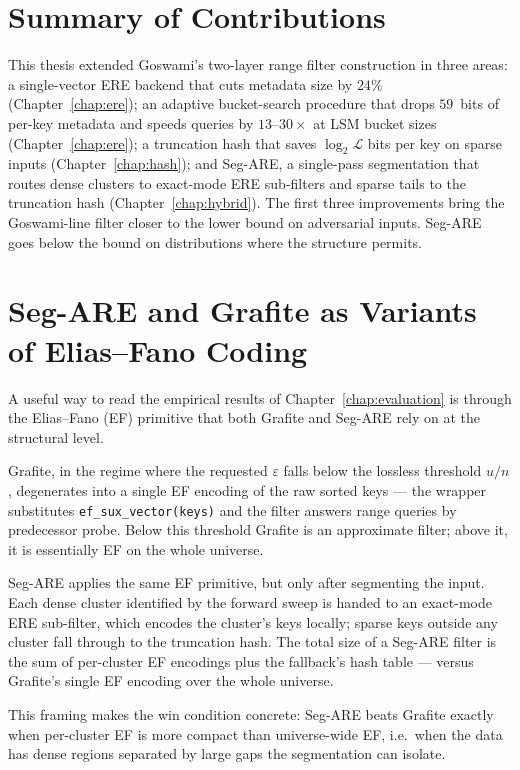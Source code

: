 \section{Summary of Contributions}
\label{sec:conclusion-summary}

This thesis extended Goswami's two-layer range filter construction in
three areas: a single-vector ERE backend that cuts metadata size by
$24\%$ (Chapter~\ref{chap:ere}); an adaptive bucket-search procedure
that drops $59$~bits of per-key metadata and speeds queries by
$13$--$30\times$ at LSM bucket sizes (Chapter~\ref{chap:ere}); a
truncation hash that saves $\log_2 \mathcal{L}$ bits per key on sparse
inputs (Chapter~\ref{chap:hash}); and Seg-ARE, a single-pass
segmentation that routes dense clusters to exact-mode ERE sub-filters
and sparse tails to the truncation hash (Chapter~\ref{chap:hybrid}).
The first three improvements bring the Goswami-line filter closer to
the lower bound on adversarial inputs. Seg-ARE goes below the bound on
distributions where the structure permits.

\section{Seg-ARE and Grafite as Variants of Elias--Fano Coding}
\label{sec:conclusion-ef-view}

A useful way to read the empirical results of
Chapter~\ref{chap:evaluation} is through the Elias--Fano (EF) primitive
that both Grafite and Seg-ARE rely on at the structural level.

Grafite, in the regime where the requested $\varepsilon$ falls below
the lossless threshold $u/n$, degenerates into a single EF encoding of
the raw sorted keys --- the wrapper substitutes
\texttt{ef\_sux\_vector(keys)} and the filter answers range queries by
predecessor probe. Below this threshold Grafite is an approximate
filter; above it, it is essentially EF on the whole universe.

Seg-ARE applies the same EF primitive, but only after segmenting the
input. Each dense cluster identified by the forward sweep is handed to
an exact-mode ERE sub-filter, which encodes the cluster's keys
locally; sparse keys outside any cluster fall through to the
truncation hash. The total size of a Seg-ARE filter is the sum of
per-cluster EF encodings plus the fallback's hash table --- versus
Grafite's single EF encoding over the whole universe.

This framing makes the win condition concrete: Seg-ARE beats Grafite
exactly when per-cluster EF is more compact than universe-wide EF,
i.e.\ when the data has dense regions separated by large gaps the
segmentation can isolate.

